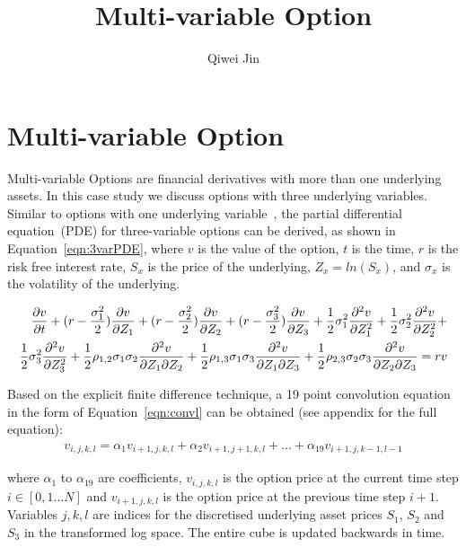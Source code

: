 \documentclass[10pt,a4paper]{article}
\begin{document}
\title{Multi-variable Option}
\author{Qiwei Jin}
\maketitle
\section{Multi-variable Option}
Multi-variable Options are financial derivatives with more than one underlying assets. In this case study we discuss options with three underlying variables. Similar to options with one underlying variable~\cite{brennan_schwartz_fd}, the partial differential equation~(PDE) for three-variable options can be derived, as shown in Equation~\ref{eqn:3varPDE}, where $v$ is the value of the option, $t$ is the time, $r$ is the risk free interest rate, $S_x$ is the price of the underlying, $Z_x=ln(S_x)$, and $\sigma _x$ is the volatility of the underlying.

\begin{align}
\frac{{\partial v}}{{\partial t}} + (r - \frac{{\sigma _1^2}}{2})\frac{{\partial v}}{{\partial {Z_1}}} + (r - \frac{{\sigma _2^2}}{2})\frac{{\partial v}}{{\partial {Z_2}}} + (r - \frac{{\sigma _3^2}}{2})\frac{{\partial v}}{{\partial {Z_3}}} + \frac{1}{2}\sigma _1^2\frac{{{\partial ^2}v}}{{\partial Z_1^2}} + \frac{1}{2}\sigma _2^2\frac{{{\partial ^2}v}}{{\partial Z_2^2}} + \notag\\
\frac{1}{2}\sigma _3^2\frac{{{\partial ^2}v}}{{\partial Z_3^2}} + \frac{1}{2}{\rho _{1,2}}{\sigma _1}{\sigma _2}\frac{{{\partial ^2}v}}{{\partial {Z_1}\partial {Z_2}}} + \frac{1}{2}{\rho _{1,3}}{\sigma _1}{\sigma _3}\frac{{{\partial ^2}v}}{{\partial {Z_1}\partial {Z_3}}} + \frac{1}{2}{\rho _{2,3}}{\sigma _2}{\sigma _3}\frac{{{\partial ^2}v}}{{\partial {Z_2}\partial {Z_3}}} = rv \label{eqn:3varPDE}
\end{align}

Based on the explicit finite difference technique, a 19 point convolution equation in the form of Equation~\ref{eqn:convl} can be obtained (see appendix for the full equation):
\begin{align}
v_{i,j,k,l} = {\alpha _1}{v_{i + 1,j,k,l}} + {\alpha _2}{v_{i + 1,j + 1,k,l}}+... + {\alpha _{19}}{v_{i + 1,j,k - 1,l - 1}} \label{eqn:convl}
\end{align}

where $\alpha _1$ to $\alpha _19$ are coefficients, $v_{i,j,k,l}$ is the option price at the current time step $i \in [0,1...N]$ and $v_{i+1,j,k,l}$ is the option price at the previous time step $i+1$. Variables $j,k,l$ are indices for the discretised underlying asset prices $S_1$, $S_2$ and $S_3$ in the transformed log space. The entire cube is updated backwards in time.
\end{document}
